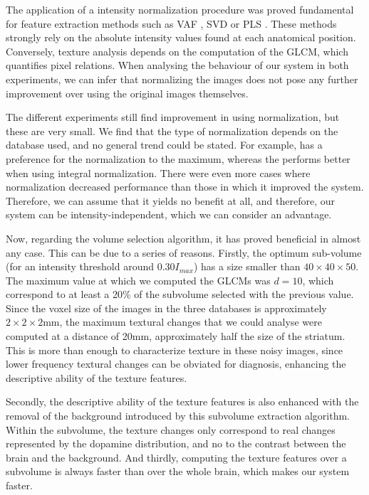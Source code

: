 The application of a intensity normalization procedure was proved fundamental for feature extraction methods such as \ac{VAF} \cite{Illan2012}, \ac{SVD} \cite{Segovia2012} or \ac{PLS} \cite{Rojas2012}. These methods strongly rely on the absolute intensity values found at each anatomical position. Conversely, texture analysis depends on the computation of the \ac{GLCM}, which quantifies pixel relations. When analysing the behaviour of our system in both experiments, we can infer that normalizing the images does not pose any further improvement over using the original images themselves. 

The different experiments still find improvement in using normalization, but these are very small. We find that the type of normalization depends on the database used, and no general trend could be stated. For example, \vdlvdat{} has a preference for the normalization to the maximum, whereas the \ppmidat{} performs better when using integral normalization. There were even more cases where normalization decreased performance than those in which it improved the system. Therefore, we can assume that it yields no benefit at all, and therefore, our system can be intensity-independent, which we can consider an advantage. 

Now, regarding the volume selection algorithm, it has proved beneficial in almost any case. This can be due to a series of reasons. Firstly, the optimum sub-volume (for an intensity threshold around $0.30 I_{max}$) has a size smaller than $40\times40\times50$. The maximum value at which we computed the \acp{GLCM} was $d=10$, which correspond to at least a 20\% of the subvolume selected with the previous value. Since the voxel size of the images in the three databases is approximately $2\times2\times2$mm, the maximum textural changes that we could analyse were computed at a distance of 20mm, approximately half the size of the striatum. This is more than enough to characterize texture in these noisy images, since lower frequency textural changes can be obviated for diagnosis, enhancing the descriptive ability of the texture features. 

Secondly, the descriptive ability of the texture features is also enhanced with the removal of the background introduced by this subvolume extraction algorithm. Within the subvolume, the texture changes only correspond to real changes represented by the dopamine distribution, and no to the contrast between the brain and the background. And thirdly, computing the texture features over a subvolume is always faster than over the whole brain, which makes our system faster. 

